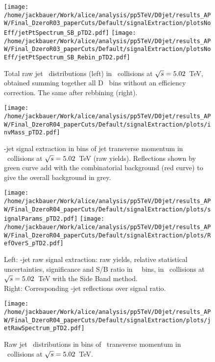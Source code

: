 \begin{figure}[bth]
\centering
	\texttt{[image: /home/jackbauer/Work/alice/analysis/pp5TeV/D0jet/results\_APW/Final\_DzeroR03\_paperCuts/Default/signalExtraction/plotsNoEff/jetPtSpectrum\_SB\_pTD2.pdf]}
	\texttt{[image: /home/jackbauer/Work/alice/analysis/pp5TeV/D0jet/results\_APW/Final\_DzeroR03\_paperCuts/Default/signalExtraction/plotsNoEff/jetPtSpectrum\_SB\_Rebin\_pTD2.pdf]}
\caption{Total raw jet \pt\ distributions (left) in \pp\ collisions at $\sqrt{s}=5.02$~TeV, obtained summing together all D \pt\ bins without an efficiency correction. The same after rebbining (right).}
\label{fig:eq_pp_signBkgJet_totR03}
\end{figure}

\begin{figure}[bth]
\centering
\texttt{[image: /home/jackbauer/Work/alice/analysis/pp5TeV/D0jet/results\_APW/Final\_DzeroR04\_paperCuts/Default/signalExtraction/plots/invMass\_pTD2.pdf]}
\caption{\Dzero-jet signal extraction in bins of jet transverse momentum in \pp\ collisions at $\sqrt{s}=5.02$~TeV (raw yields). %
Reflections shown by green curve add with the combinatorial background (red curve) to give the overall background in grey.
}
\label{fig:eq_pp_InvMass_Dzero_DbinsR04}
\end{figure}

\begin{figure}[bth]
\centering
\texttt{[image: /home/jackbauer/Work/alice/analysis/pp5TeV/D0jet/results\_APW/Final\_DzeroR04\_paperCuts/Default/signalExtraction/plots/signalParams\_pTD2.pdf]}
\texttt{[image: /home/jackbauer/Work/alice/analysis/pp5TeV/D0jet/results\_APW/Final\_DzeroR04\_paperCuts/Default/signalExtraction/plots/RefOverS\_pTD2.pdf]}
\caption{Left: \Dzero-jet raw signal extraction: raw yields, relative statistical uncertainties, significance and S/B ratio in \Dzero\ \pt\ bins, in \pp\ collisions at $\sqrt{s}=5.02$~TeV with the Side Band method.
\\Right: Corresponding \Dzero-jet reflections over signal ratio.}
\label{fig:eq_pp_RSU_raw_Dbins_DzeroR04}
\end{figure}

\begin{figure}[bth]
\centering
\texttt{[image: /home/jackbauer/Work/alice/analysis/pp5TeV/D0jet/results\_APW/Final\_DzeroR04\_paperCuts/Default/signalExtraction/plots/jetRawSpectrum\_pTD2.pdf]}
\caption{Raw jet \pt\ distributions in bins of \Dzero\ transverse momentum in \pp\ collisions at $\sqrt{s}=5.02$~TeV.}
\label{fig:eq_pp_signBkgJet_Dzero_DbinsR04}
\end{figure}

